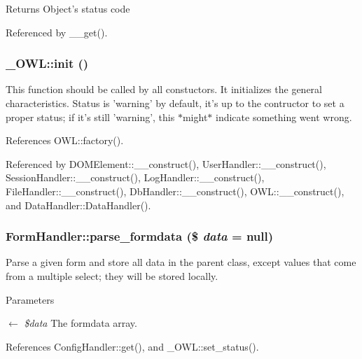 \begin{DoxyReturn}{Returns}
Object's status code 
\end{DoxyReturn}


Referenced by \_\-\_\-get().

\subsubsection[{init}]{\setlength{\rightskip}{0pt plus 5cm}\_\-OWL::init ()}\label{class__OWL_ae0ef3ded56e8a6b34b6461e5a721cd3e}
This function should be called by all constuctors. It initializes the general characteristics. Status is 'warning' by default, it's up to the contructor to set a proper status; if it's still 'warning', this $\ast$might$\ast$ indicate something went wrong. 

References OWL::factory().



Referenced by DOMElement::\_\-\_\-construct(), UserHandler::\_\-\_\-construct(), SessionHandler::\_\-\_\-construct(), LogHandler::\_\-\_\-construct(), FileHandler::\_\-\_\-construct(), DbHandler::\_\-\_\-construct(), OWL::\_\-\_\-construct(), and DataHandler::DataHandler().

\subsubsection[{parse\_\-formdata}]{\setlength{\rightskip}{0pt plus 5cm}FormHandler::parse\_\-formdata (\$ {\em data} = {\ttfamily null})}\label{classFormHandler_aef73c198dbc5de4e84f6c2a23b8b294c}
Parse a given form and store all data in the parent class, except values that come from a multiple select; they will be stored locally.


\begin{DoxyParams}{Parameters}
\item[\mbox{$\leftarrow$} {\em \$data}]The formdata array. \end{DoxyParams}


References ConfigHandler::get(), and \_\-OWL::set\_\-status().



